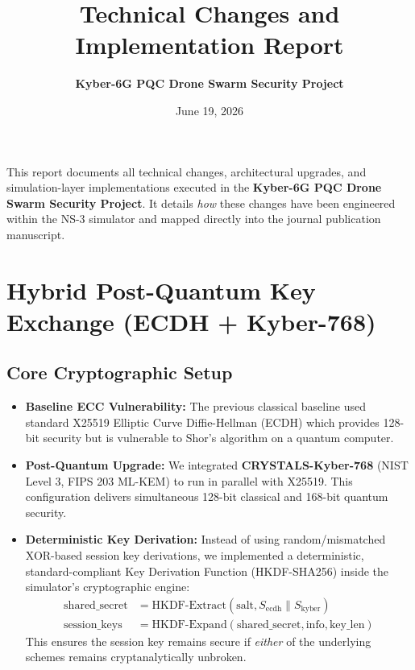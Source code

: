 \documentclass[11pt,a4paper]{article}
\title{\textbf{Technical Changes and Implementation Report}}
\author{\textbf{Kyber-6G PQC Drone Swarm Security Project}}
\date{June 19, 2026}
\begin{document}
\maketitle
\thispagestyle{fancy}

This report documents all technical changes, architectural upgrades, and simulation-layer implementations executed in the \textbf{Kyber-6G PQC Drone Swarm Security Project}. It details \textit{how} these changes have been engineered within the NS-3 simulator and mapped directly into the journal publication manuscript.

\hrulefill

\section{Hybrid Post-Quantum Key Exchange (ECDH + Kyber-768)}

\subsection{Core Cryptographic Setup}
\begin{itemize}
    \item \textbf{Baseline ECC Vulnerability:} The previous classical baseline used standard X25519 Elliptic Curve Diffie-Hellman (ECDH) which provides 128-bit security but is vulnerable to Shor's algorithm on a quantum computer.
    \item \textbf{Post-Quantum Upgrade:} We integrated \textbf{CRYSTALS-Kyber-768} (NIST Level 3, FIPS 203 ML-KEM) to run in parallel with X25519. This configuration delivers simultaneous 128-bit classical and 168-bit quantum security.
    \item \textbf{Deterministic Key Derivation:} Instead of using random/mismatched XOR-based session key derivations, we implemented a deterministic, standard-compliant Key Derivation Function (HKDF-SHA256) inside the simulator's cryptographic engine:
    \begin{align*}
        \text{shared\_secret} &= \text{HKDF-Extract}(\text{salt}, S_{\text{ecdh}} \parallel S_{\text{kyber}}) \\
        \text{session\_keys} &= \text{HKDF-Expand}(\text{shared\_secret}, \text{info}, \text{key\_len})
    \end{align*}
    This ensures the session key remains secure if \textit{either} of the underlying schemes remains cryptanalytically unbroken.
\end{itemize}
\end{document}
